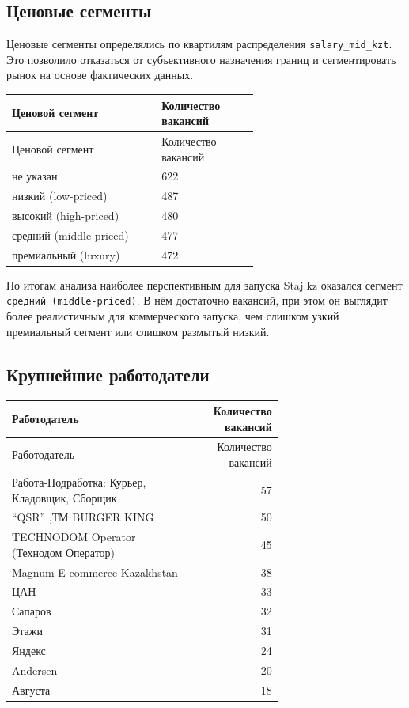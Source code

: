 \documentclass[12pt,a4paper]{article}
\begin{document}
\subsection{Ценовые сегменты}
Ценовые сегменты определялись по квартилям распределения \texttt{salary\_mid\_kzt}. Это позволило отказаться от субъективного назначения границ и сегментировать рынок на основе фактических данных.

\begin{longtable}{p{0.40\linewidth}p{0.22\linewidth}}
\toprule
Ценовой сегмент & Количество вакансий\\
\midrule
\endfirsthead
\toprule
Ценовой сегмент & Количество вакансий\\
\midrule
\endhead
не указан & 622\\
низкий (low-priced) & 487\\
высокий (high-priced) & 480\\
средний (middle-priced) & 477\\
премиальный (luxury) & 472\\
\bottomrule
\end{longtable}

По итогам анализа наиболее перспективным для запуска Staj.kz оказался сегмент \texttt{средний (middle-priced)}. В нём достаточно вакансий, при этом он выглядит более реалистичным для коммерческого запуска, чем слишком узкий премиальный сегмент или слишком размытый низкий.

\subsection{Крупнейшие работодатели}
\begin{longtable}{p{0.68\linewidth}r}
\toprule
Работодатель & Количество вакансий\\
\midrule
\endfirsthead
\toprule
Работодатель & Количество вакансий\\
\midrule
\endhead
Работа-Подработка: Курьер, Кладовщик, Сборщик & 57\\
“QSR” ,ТМ BURGER KING & 50\\
TECHNODOM Operator (Технодом Оператор) & 45\\
Magnum E-commerce Kazakhstan & 38\\
ЦАН & 33\\
Сапаров & 32\\
Этажи & 31\\
Яндекс & 24\\
Andersen & 20\\
Августа & 18\\
\bottomrule
\end{longtable}
\end{document}
